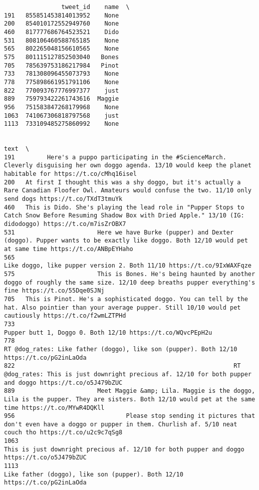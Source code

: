 \documentclass[11pt]{article}
\begin{document}
    
    \begin{verbatim}
                tweet_id    name  \
191   855851453814013952    None   
200   854010172552949760    None   
460   817777686764523521    Dido   
531   808106460588765185    None   
565   802265048156610565    None   
575   801115127852503040   Bones   
705   785639753186217984   Pinot   
733   781308096455073793    None   
778   775898661951791106    None   
822   770093767776997377    just   
889   759793422261743616  Maggie   
956   751583847268179968    None   
1063  741067306818797568    just   
1113  733109485275860992    None   

                                                                                                                                                                      text  \
191         Here's a puppo participating in the #ScienceMarch. Cleverly disguising her own doggo agenda. 13/10 would keep the planet habitable for https://t.co/cMhq16isel   
200   At first I thought this was a shy doggo, but it's actually a Rare Canadian Floofer Owl. Amateurs would confuse the two. 11/10 only send dogs https://t.co/TXdT3tmuYk   
460   This is Dido. She's playing the lead role in "Pupper Stops to Catch Snow Before Resuming Shadow Box with Dried Apple." 13/10 (IG: didodoggo) https://t.co/m7isZrOBX7   
531                       Here we have Burke (pupper) and Dexter (doggo). Pupper wants to be exactly like doggo. Both 12/10 would pet at same time https://t.co/ANBpEYHaho   
565                                                                                                  Like doggo, like pupper version 2. Both 11/10 https://t.co/9IxWAXFqze   
575                       This is Bones. He's being haunted by another doggo of roughly the same size. 12/10 deep breaths pupper everything's fine https://t.co/55Dqe0SJNj   
705   This is Pinot. He's a sophisticated doggo. You can tell by the hat. Also pointier than your average pupper. Still 10/10 would pet cautiously https://t.co/f2wmLZTPHd   
733                                                                                                             Pupper butt 1, Doggo 0. Both 12/10 https://t.co/WQvcPEpH2u   
778                                                                              RT @dog_rates: Like father (doggo), like son (pupper). Both 12/10 https://t.co/pG2inLaOda   
822                                                             RT @dog_rates: This is just downright precious af. 12/10 for both pupper and doggo https://t.co/o5J479bZUC   
889                       Meet Maggie &amp; Lila. Maggie is the doggo, Lila is the pupper. They are sisters. Both 12/10 would pet at the same time https://t.co/MYwR4DQKll   
956                               Please stop sending it pictures that don't even have a doggo or pupper in them. Churlish af. 5/10 neat couch tho https://t.co/u2c9c7qSg8   
1063                                                                           This is just downright precious af. 12/10 for both pupper and doggo https://t.co/o5J479bZUC   
1113                                                                                            Like father (doggo), like son (pupper). Both 12/10 https://t.co/pG2inLaOda   


\end{verbatim}
\end{document}
